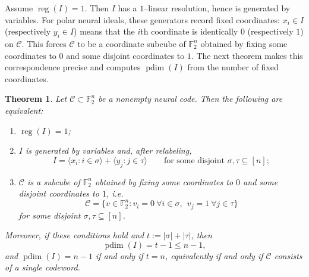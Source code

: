 \documentclass[12pt]{amsart}
\newtheorem{theorem}{Theorem}[section]
\theoremstyle{remark}
\theoremstyle{definition}
\DeclareMathOperator{\reg}{reg}
\DeclareMathOperator{\pd}{pdim}
\newcommand{\F}{\mathbb{F}}
\newcommand{\C}{\mathcal{C}}
\begin{document}
Assume $\reg(I)=1$.  Then $I$ has a $1$--linear resolution, hence is generated by variables.  For polar
neural ideals, these generators record fixed coordinates: $x_i\in I$ (respectively $y_i\in I$) means that
the $i$th coordinate is identically $0$ (respectively $1$) on $\C$.  This forces $\C$ to be a coordinate
subcube of $\F_2^n$ obtained by fixing some coordinates to $0$ and some disjoint coordinates to $1$.
The next theorem makes this correspondence precise and computes $\pd(I)$ from the number of fixed
coordinates.


\begin{theorem}\label{thm:reg1-classification}
Let $\C\subset \F_2^n$ be a nonempty neural code.
Then the following are equivalent:
\begin{enumerate}
\item $\reg(I)=1$;
\item $I$ is generated by variables and, after relabeling,
\[
I=\langle x_i : i\in\sigma\rangle+\langle y_j : j\in\tau\rangle
\qquad\text{for some disjoint }\sigma,\tau\subseteq[n];
\]
\item $\C$ is a subcube of $\F_2^n$ obtained by fixing some coordinates to $0$ and some disjoint coordinates to $1$, i.e.
\[
\C=\{ v\in \F_2^n : v_i=0\ \forall i\in\sigma,\ \ v_j=1\ \forall j\in\tau \}
\]
for some disjoint $\sigma,\tau\subseteq[n]$.
\end{enumerate}
Moreover, if these conditions hold and $t:=|\sigma|+|\tau|$, then
\[
\pd(I)=t-1\le n-1,
\]
and $\pd(I)=n-1$ if and only if $t=n$, equivalently if and only if $\C$ consists of a single codeword.
\end{theorem}
\end{document}
